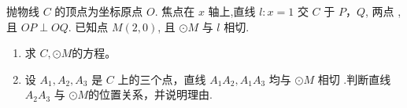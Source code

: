\documentclass[class=ctexart,crop=false]{standalone}
\begin{document}
抛物线 $C$ 的顶点为坐标原点 $O$. 焦点在 $x$ 轴上,直线 $l:x=1$
交 $C$ 于 $P，Q$, 两点 ,且 $OP \perp OQ$. 已知点 $M(2,0)$,
且 $\odot M$ 与 $l$ 相切.
\begin{enumerate}[label=(\arabic*)]
    \item 求 $C,\odot M$的方程。
    \item 设 $A_1,A_2,A_3$ 是 $C$ 上的三个点，直线 $A_1A_2,A_1A_3$
          均与 $\odot M$ 相切 .判断直线 $A_2A_3$ 与 $\odot M$的位置关系，并说明理由.
\end{enumerate}
\end{document}
